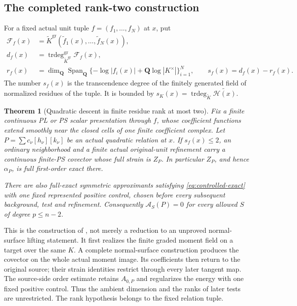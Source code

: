 \documentclass[11pt,a4paper]{article}
\newcommand{\MathEqref}[1]{{\hypersetup{linkcolor=EquationLink}\eqref{#1}}}
\newtheorem{theorem}{Theorem}[section]
\theoremstyle{definition}
\theoremstyle{remark}
\numberwithin{equation}{section}
\newcommand{\Q}{\mathbf Q}
\newcommand{\A}{\mathcal A}
\newcommand{\gr}{\mathrm{gr}}
\begin{document}
\subsection{The completed rank-two construction}

For a fixed actual unit tuple $f=(f_1,\ldots,f_N)$ at $x$, put
\begin{align}
 \mathscr F_f(x)&=\widetilde K^{\gr}
                  (\widetilde f_1(x),\ldots,\widetilde f_N(x)),\nonumber\\
 d_f(x)&=\operatorname{trdeg}^{\gr}_{\widetilde K^{\gr}}
                           \mathscr F_f(x),\nonumber\\
 r_f(x)&=\dim_\Q\operatorname{Span}_\Q
     \{-\log|f_i(x)|+\Q\log|K^\times|\}_{i=1}^N,
 \qquad s_f(x)=d_f(x)-r_f(x).
                         \label{eq:residue-rank}
\end{align}
The number $s_f(x)$ is the transcendence degree of the finitely
generated field of normalized residues of the tuple.  It is bounded by
$s_K(x)=\operatorname{trdeg}_{\widetilde K}\widetilde{\mathcal H(x)}$.

\begin{theorem}[Quadratic descent in finite residue rank at most two]
\label{thm:rank-two}
Fix a finite continuous PL or PS scalar presentation through $f$,
whose coefficient functions extend smoothly near the closed cells of
one finite coefficient complex.  Let
$P=\sum c_\nu[h_\nu][k_\nu]$ be an actual quadratic relation at $x$.
If $s_f(x)\le2$, an ordinary neighborhood and a finite actual
original-unit refinement carry a continuous finite-PS covector whose
full strain is $Z_P$.  In particular $Z_P$, and hence $\alpha_P$,
is full first-order exact there.

There are also full-exact symmetric approximants satisfying
\MathEqref{eq:controlled-exact} with one fixed represented positive
control, chosen before every subsequent background, test and refinement.
Consequently $\A_S(P)=0$ for every allowed $S$ of degree $p\le n-2$.
\end{theorem}

This is the construction of \cite{I11}, not merely a reduction to an
unproved normal-surface lifting statement.  It first realizes the
finite graded moment field on a target over the same $K$.  A complete
normal-surface construction produces the covector on the whole actual
moment image.  Its coefficients then return to the original source;
their strain identities restrict through every later tangent map.
The source-side order estimate retains $A_{0,P}$ and regularizes the
energy with one fixed positive control.  Thus the ambient dimension
and the ranks of later tests are unrestricted.  The rank hypothesis
belongs to the fixed relation tuple.
\end{document}
